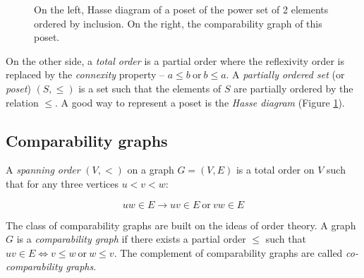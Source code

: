 \begin{figure}
\centering

\begin{scaletikzpicturetowidth}{\textwidth}
\end{scaletikzpicturetowidth}

\caption{On the left, Hasse diagram of a poset of the power set of 2 elements ordered by inclusion.
On the right, the comparability graph of this poset.}
\label{fig:hasse}
\end{figure}

On the other side, a \emph{total order} is a partial order where the reflexivity order is replaced by the \emph{connexity} property -- $a \leq b\ \text{or}\  b \leq a$. A \emph{partially ordered set} (or \emph{poset}) $(S,\leqslant)$ is a set such that the elements of $S$ are partially ordered by the relation $\leqslant$. A good way to represent a poset is the \emph{Hasse diagram} (Figure \ref{fig:hasse}).

\subsection{Comparability graphs}

A \emph{spanning order} $(V,<)$ on a graph $G = (V,E)$ is a total order on $V$ such that for any three vertices $u < v < w$:

  $$uw \in E \to uv \in E\ \text{or}\ vw \in E$$

The class of comparability graphs are built on the ideas of order theory. A graph $G$ is a \emph{comparability graph} if there exists a partial order $\leqslant$ such that $uv \in E \Leftrightarrow v \leqslant w\  \text{or}\  w \leqslant v$. The complement of comparability graphs are called \emph{co-comparability graphs}.



